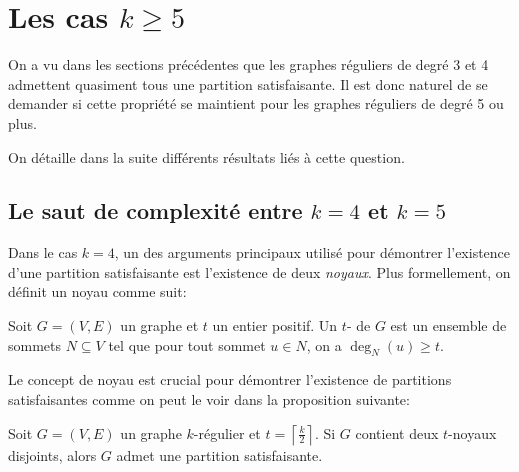 \section{Les cas \(k \geq 5\)}\label{sec:saut_complexite}

On a vu dans les sections précédentes que les graphes réguliers de degré 3 et 4 admettent quasiment tous une partition satisfaisante.
Il est donc naturel de se demander si cette propriété se maintient pour les graphes réguliers de degré 5 ou plus.

On détaille dans la suite différents résultats liés à cette question.

\subsection{Le saut de complexité entre \(k = 4\) et \(k = 5\)}

Dans le cas \(k = 4\), un des arguments principaux utilisé pour démontrer l'existence d'une partition satisfaisante est l'existence de deux \emph{noyaux}.
Plus formellement, on définit un noyau comme suit:

\begin{definition}
    Soit \(G = (V, E)\) un graphe et \(t\) un entier positif.
    Un \(t\)- de \(G\) est un ensemble de sommets \(N \subseteq V\) tel que pour tout sommet \(u \in N\), on a \(\deg_N(u) \geq t\).
\end{definition}

Le concept de noyau est crucial pour démontrer l'existence de partitions satisfaisantes comme on peut le voir dans la proposition suivante:

\begin{proposition}
    Soit \(G = (V, E)\) un graphe \(k\)-régulier et \(t = \left\lceil \frac{k}{2} \right\rceil\).
    Si \(G\) contient deux \(t\)-noyaux disjoints, alors \(G\) admet une partition satisfaisante.
\end{proposition}

